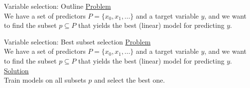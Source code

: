 \documentclass[8pt]{beamer}
\begin{document}
    \def\codewidth{10cm}

    \begin{frame}[t]{Variable selection: Outline} %
        \underline{Problem}\\
        We have a set of predictors $P=\{x_0, x_1, ...\}$ and a target variable $y$, and we want to find the subset $p \subseteq P$ that yields the best (linear) model for predicting $y$.\\
        \vspace{0.25cm}

        \centering
    \end{frame}

    \begin{frame}[t]{Variable selection: Best subset selection} %
        \underline{Problem}\\
        We have a set of predictors $P=\{x_0, x_1, ...\}$ and a target variable $y$, and we want to find the subset $p \subseteq P$ that yields the best (linear) model for predicting $y$.\\
        \vspace{0.25cm}
        \underline{Solution}\\
        Train models on all subsets $p$ and select the best one.
    \end{frame}
\end{document}

